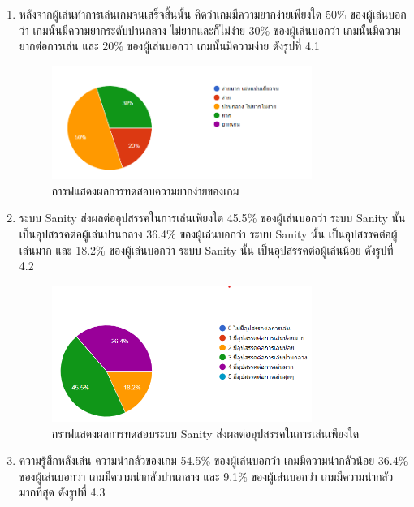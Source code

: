 \begin{enumerate}
    \item หลังจากผู้เล่นทำการเล่นเกมจนเสร็จสิ้นนั้น คิดว่าเกมมีความยากง่ายเพียงใด 50$\%$ ของผู้เล่นบอกว่า เกมนั้นมีความยากระดับปานกลาง ไม่ยากและก็ไม่ง่าย 30$\%$ ของผู้เล่นบอกว่า เกมนั้นมีความยากต่อการเล่น และ 20$\%$ ของผู้เล่นบอกว่า เกมนั้นมีความง่าย ดังรูปที่ 4.1
    \begin{figure}
        \centering
        \includegraphics[width=0.8\textwidth, height=0.20\textheight]{Images/Graph difficult.png}
        \caption[การฟแสดงผลการทดสอบความยากง่ายของเกม]{การฟแสดงผลการทดสอบความยากง่ายของเกม}
    \end{figure}
    \item ระบบ Sanity ส่งผลต่ออุปสรรคในการเล่นเพียงใด 45.5$\%$ ของผู้เล่นบอกว่า ระบบ Sanity นั้น เป็นอุปสรรคต่อผู้เล่นปานกลาง 36.4$\%$ ของผู้เล่นบอกว่า ระบบ Sanity นั้น เป็นอุปสรรคต่อผู้เล่นมาก และ 18.2$\%$ ของผู้เล่นบอกว่า ระบบ Sanity นั้น เป็นอุปสรรคต่อผู้เล่นน้อย ดังรูปที่ 4.2
    \begin{figure}
        \centering
        \includegraphics[width=0.8\textwidth, height=0.20\textheight]{Images/Graph Sanity.png}
        \caption[กราฟแสดงผลการทดสอบระบบ Sanity ส่งผลต่ออุปสรรคในการเล่นเพียงใด]{กราฟแสดงผลการทดสอบระบบ Sanity ส่งผลต่ออุปสรรคในการเล่นเพียงใด}
    \end{figure}
    \item ความรู้สึกหลังเล่น ความน่ากลัวของเกม 54.5$\%$ ของผู้เล่นบอกว่า เกมมีความน่ากลัวน้อย 36.4$\%$ ของผู้เล่นบอกว่า เกมมีความน่ากลัวปานกลาง และ 9.1$\%$ ของผู้เล่นบอกว่า เกมมีความน่ากลัวมากที่สุด ดังรูปที่ 4.3

\end{enumerate}
